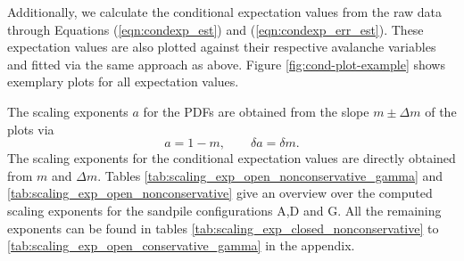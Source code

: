 \begin{table}[!ht]
  \centering
  
  \caption{Scaling exponents of the probability density functions for the open-boundary, nonconservative sandpile configurations (A, D, G). The exponents $\alpha$, $\tau$, and $\lambda$ are obtained from weighted linear least-squares fits on double-logarithmic PDF plots in the selected scaling window; uncertainties are taken from the fit error.}
  \label{tab:scaling_exp_open_nonconservative}
\end{table}


\begin{table}[!ht]
  \centering
  
  \caption{Conditional scaling exponents for the open-boundary, nonconservative sandpile configurations (A, D, G). The exponents $\gamma_1$, $\gamma_2$, and $\gamma_3$ (and their inverse fits) are obtained from weighted linear least-squares fits of conditional expectation values on double-logarithmic plots in the selected scaling window; uncertainties are taken from the fit error.}
  \label{tab:scaling_exp_open_nonconservative_gamma}
\end{table}


Additionally, we calculate the conditional expectation values from the raw data through Equations (\ref{eqn:condexp_est}) and (\ref{eqn:condexp_err_est}). These expectation values are also plotted against their respective avalanche variables and fitted via the same approach as above. Figure \ref{fig:cond-plot-example} shows exemplary plots for all expectation values.

The scaling exponents $a$ for the PDFs are obtained from the slope $m\pm\Delta m$ of the plots via
\begin{equation}
  a = 1-m, \qquad \delta a = \delta m.
\end{equation}
The scaling exponents for the conditional expectation values are directly obtained from $m$ and $\Delta m$. Tables \ref{tab:scaling_exp_open_nonconservative_gamma} and \ref{tab:scaling_exp_open_nonconservative} give an overview over the computed scaling exponents for the sandpile configurations A,D and G. All the remaining exponents can be found in tables \ref{tab:scaling_exp_closed_nonconservative} to \ref{tab:scaling_exp_open_conservative_gamma} in the appendix.
